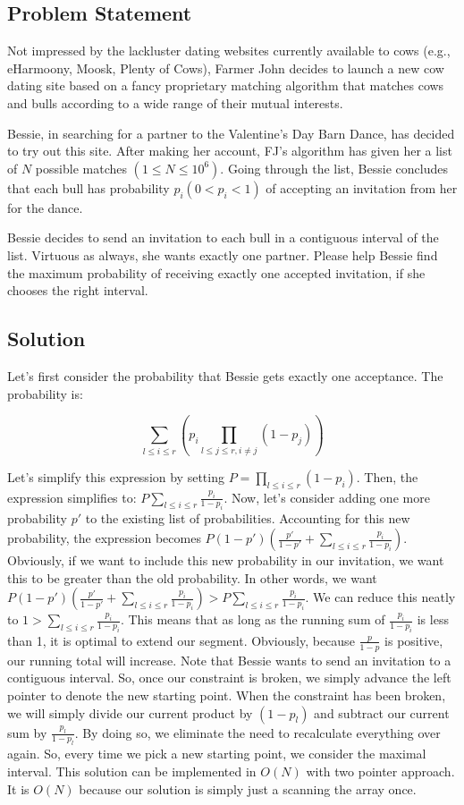 \documentclass{article}
\begin{document}
\subsection{Problem Statement}
Not impressed by the lackluster dating websites currently available to cows (e.g., eHarmoony, Moosk, Plenty of Cows), Farmer John decides to launch a new cow dating site based on a fancy proprietary matching algorithm that matches cows and bulls according to a wide range of their mutual interests. 

Bessie, in searching for a partner to the Valentine’s Day Barn Dance, has decided to try out this site. After making her account, FJ’s algorithm has given her a list of $N$ possible matches $(1 \leq N \leq 10^6)$. Going through the list, Bessie concludes that each bull has probability $p_i (0 < p_i < 1)$ of accepting an invitation from her for the dance.

Bessie decides to send an invitation to each bull in a contiguous interval of the list. Virtuous as always, she wants exactly one partner. Please help Bessie find the maximum probability of receiving exactly one accepted invitation, if she chooses the right interval.

\subsection{Solution}
Let's first consider the probability that Bessie gets exactly one acceptance. The probability is:

\[\sum\limits_{l \leq i \leq r}(p_i \prod\limits_{l \leq j \leq r, i \neq j} (1 - p_j))\]

Let's simplify this expression by setting $P = \prod\limits_{l \leq i \leq r} (1 - p_i)$. Then, the expression simplifies to: $P \sum\limits_{l \leq i \leq r}\frac{p_i}{1 - p_i}$. Now, let's consider adding one more probability $p'$ to the existing list of probabilities. Accounting for this new probability, the expression becomes $P(1-p')(\frac{p'}{1-p'} + \sum\limits_{l \leq i \leq r}\frac{p_i}{1 - p_i})$. Obviously, if we want to include this new probability in our invitation, we want this to be greater than the old probability. In other words, we want $P(1-p')(\frac{p'}{1-p'} + \sum\limits_{l \leq i \leq r}\frac{p_i}{1 - p_i}) > P \sum\limits_{l \leq i \leq r}\frac{p_i}{1 - p_i}$. We can reduce this neatly to $1 > \sum\limits_{l \leq i \leq r}\frac{p_i}{1 - p_i}$. This means that as long as the running sum of $\frac{p_i}{1-p_i}$ is less than 1, it is optimal to extend our segment. Obviously, because $\frac{p}{1-p}$ is positive, our running total will increase. Note that Bessie wants to send an invitation to a contiguous interval. So, once our constraint is broken, we simply advance the left pointer to denote the new starting point. When the constraint has been broken, we will simply divide our current product by $(1 - p_l)$ and subtract our current sum by $\frac{p_l}{1-p_l}$. By doing so, we eliminate the need to recalculate everything over again. So, every time we pick a new starting point, we consider the maximal interval. This solution can be implemented in $O(N)$ with two pointer approach. It is $O(N)$ because our solution is simply just a scanning the array once.
\end{document}
